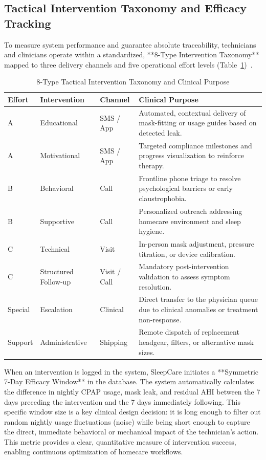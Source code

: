 \documentclass[conference]{IEEEtran}
\begin{document}
\subsection{Tactical Intervention Taxonomy and Efficacy Tracking}

To measure system performance and guarantee absolute traceability, technicians and clinicians operate within a standardized, **8-Type Intervention Taxonomy** mapped to three delivery channels and five operational effort levels (Table~\ref{tab:taxonomy})~\cite{kakaei2024bhi,kakaei2025skima}.

\begin{table}[htbp]
\caption{8-Type Tactical Intervention Taxonomy and Clinical Purpose}
\label{tab:taxonomy}
\begin{center}
\begin{tabular}{p{0.7cm}p{1.5cm}p{1.2cm}p{3.6cm}}
\toprule
\textbf{Effort} & \textbf{Intervention} & \textbf{Channel} & \textbf{Clinical Purpose} \\
\midrule
A & Educational & SMS / App & Automated, contextual delivery of mask-fitting or usage guides based on detected leak. \\
A & Motivational & SMS / App & Targeted compliance milestones and progress visualization to reinforce therapy. \\
\midrule
B & Behavioral & Call & Frontline phone triage to resolve psychological barriers or early claustrophobia. \\
B & Supportive & Call & Personalized outreach addressing homecare environment and sleep hygiene. \\
\midrule
C & Technical & Visit & In-person mask adjustment, pressure titration, or device calibration. \\
C & Structured Follow-up & Visit / Call & Mandatory post-intervention validation to assess symptom resolution. \\
\midrule
Special & Escalation & Clinical & Direct transfer to the physician queue due to clinical anomalies or treatment non-response. \\
\midrule
Support & Administrative & Shipping & Remote dispatch of replacement headgear, filters, or alternative mask sizes. \\
\bottomrule
\end{tabular}
\end{center}
\end{table}

When an intervention is logged in the system, SleepCare initiates a **Symmetric 7-Day Efficacy Window** in the database. The system automatically calculates the difference in nightly CPAP usage, mask leak, and residual AHI between the 7 days preceding the intervention and the 7 days immediately following. This specific window size is a key clinical design decision: it is long enough to filter out random nightly usage fluctuations (noise) while being short enough to capture the direct, immediate behavioral or mechanical impact of the technician's action. This metric provides a clear, quantitative measure of intervention success, enabling continuous optimization of homecare workflows.
\end{document}
